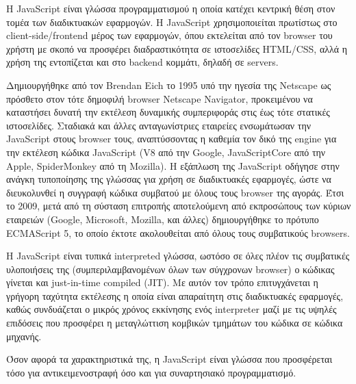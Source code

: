 \documentclass[../thesis.tex]{subfiles}
\begin{document}
Η JavaScript είναι γλώσσα προγραμματισμού η οποία κατέχει κεντρική θέση στον τομέα των διαδικτυακών εφαρμογών.
Η JavaScript χρησιμοποιείται πρωτίστως στο client-side/frontend μέρος των εφαρμογών, όπου εκτελείται από τον browser του χρήστη με σκοπό να προσφέρει διαδραστικότητα σε ιστοσελίδες HTML/CSS, αλλά η χρήση της εντοπίζεται και στο backend κομμάτι, δηλαδή σε servers.

Δημιουργήθηκε από τον Brendan Eich το 1995 υπό την ηγεσία της Netscape ως πρόσθετο στον τότε δημοφιλή browser Netscape Navigator, προκειμένου να καταστήσει δυνατή την εκτέλεση δυναμικής συμπεριφοράς στις έως τότε στατικές ιστοσελίδες.
Σταδιακά και άλλες ανταγωνίστριες εταιρείες ενσωμάτωσαν την JavaScript στους browser τους, αναπτύσσοντας η καθεμία τον δικό της engine για την εκτέλεση κώδικα JavaScript (V8 από την Google, JavaScriptCore από την Apple, SpiderMonkey από τη Mozilla).
Η εξάπλωση της JavaScript οδήγησε στην ανάγκη τυποποίησης της γλώσσας για χρήση σε διαδικτυακές εφαρμογές, ώστε να διευκολυνθεί η συγγραφή κώδικα συμβατού με όλους τους browser της αγοράς.
Έτσι το 2009, μετά από τη σύσταση επιτροπής αποτελούμενη από εκπροσώπους των κύριων εταιρειών (Google, Microsoft, Mozilla, και άλλες) δημιουργήθηκε το πρότυπο ECMAScript 5, το οποίο έκτοτε ακολουθείται από όλους τους συμβατικούς browsers.

Η JavaScript είναι τυπικά interpreted γλώσσα, ωστόσο σε όλες πλέον τις συμβατικές υλοποιήσεις της (συμπεριλαμβανομένων όλων των σύγχρονων browser) ο κώδικας γίνεται και just-in-time compiled (JIT).
Με αυτόν τον τρόπο επιτυγχάνεται η γρήγορη ταχύτητα εκτέλεσης η οποία είναι απαραίτητη στις διαδικτυακές εφαρμογές, καθώς συνδυάζεται ο μικρός χρόνος εκκίνησης ενός interpreter μαζί με τις υψηλές επιδόσεις που προσφέρει η μεταγλώττιση κομβικών τμημάτων του κώδικα σε κώδικα μηχανής.

Όσον αφορά τα χαρακτηριστικά της, η JavaScript είναι γλώσσα που προσφέρεται τόσο για αντικειμενοστραφή όσο και για συναρτησιακό προγραμματισμό.
\end{document}
